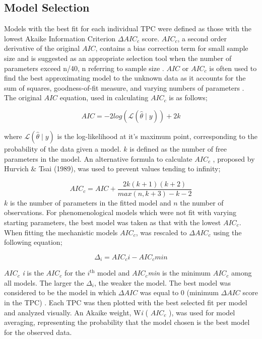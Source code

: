\documentclass[11pt]{article}
\begin{document}
\begin{linenumbers}
\subsection{Model Selection}
Models with the best fit for each individual TPC were defined as those with the lowest Akaike Information Criterion \(\Delta AIC_c\) score. \(AIC_c\), a second order derivative of the original \(AIC\), contains a bias correction term for small sample size and is suggested as an appropriate selection tool when the number of parameters exceed n/40, n referring to sample size \cite{article2}. \(AIC\) or \(AIC_c\) is often used to find the best approximating model to the unknown data as it accounts for the sum of squares, goodness-of-fit measure, and varying numbers of parameters \cite{citeulike:4425594}. The original \(AIC\) equation, used in calculating \(AIC_c\) is as follows;

\begin{equation}
AIC = -2log({\mathcal{L}}(\hat{\theta}\mid y)) + 2k \tag{6}
\end{equation}

where $\mathcal{L}(\hat{\theta}\mid y)$ is the log-likelihood at it's maximum point, corresponding to the probability of the data given a model. \(k\) is defined as the number of free parameters in the model. An alternative formula to calculate \(AIC_c\) , proposed by Hurvich \& Tsai (1989), was used to prevent values tending to infinity;

\begin{equation}
AIC_c = AIC + \frac{2k(k+1)(k+2)}{max(n,k +3) - k - 2}\tag{7}
\end{equation}
\vspace{0.1cm}
\(k\) is the number of parameters in the fitted model and \(n\) the number of observations. For phenomenological models which were not fit with varying starting parameters, the best model was taken as that with the lowest \(AIC_c\). When fitting the mechanistic models \(AIC_c\), was rescaled to \(\Delta AIC_c\) using the following equation;

\begin{equation}
\Delta_i = AIC_c i - AIC_c min \tag{8}
\end{equation}


\( AIC_c \) \textit{i} is the \(AIC_c\) for the $i^{\text{th}}$ model and \(AIC_c\)\textit{min} is the minimum \(AIC_c\) among all models. The larger the \(\Delta_i\), the weaker the model. The best model was considered to be the model in which \(\Delta AIC\) was equal to 0 (minimum \(\Delta AIC\) score in the TPC) \cite{article3}. Each TPC was then plotted with the best selected fit per model and analyzed visually. An Akaike weight, W\textit{i} ( \(AIC_c\) ), was used for model averaging, representing the probability that the model chosen is the best model for the observed data.


\end{linenumbers}
\end{document}
